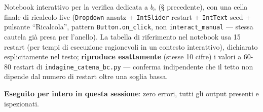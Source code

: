 \documentclass[11pt,a4paper]{article}
\begin{document}
Notebook interattivo per la verifica dedicata a $b_c$ (§ precedente), con una
cella finale di ricalcolo live (\texttt{Dropdown} ansatz + \texttt{IntSlider}
restart + \texttt{IntText} seed + pulsante ``Ricalcola'', pattern
\texttt{Button.on\_click}, non \texttt{interact\_manual} — stessa cautela già presa
per l'anello). La tabella di riferimento nel notebook usa 15 restart (per tempi di
esecuzione ragionevoli in un contesto interattivo), dichiarato esplicitamente nel
testo; \textbf{riproduce esattamente} (stesse 10 cifre) i valori a 60-80 restart di
\texttt{indagine\_catena\_bc.py} — conferma indipendente che il tetto non dipende
dal numero di restart oltre una soglia bassa.

\textbf{Eseguito per intero in questa sessione}: zero errori, tutti gli output
presenti e ispezionati.
\end{document}
